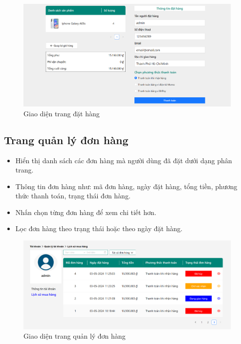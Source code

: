 \begin{figure}[H]
    \begin{center}
    \includegraphics[scale=0.4]{images/hieu/chap-5/payment.png}
    \vspace*{3mm}
    \caption{Giao diện trang đặt hàng}
    \end{center}
\end{figure}
\subsection{Trang quản lý đơn hàng}
\begin{itemize}
    \item Hiển thị danh sách các đơn hàng mà người dùng đã đặt dưới dạng phân trang.
    \item Thông tin đơn hàng như: mã đơn hàng, ngày đặt hàng, tổng tiền, phương thức thanh toán, trạng thái đơn hàng.
    \item Nhấn chọn từng đơn hàng để xem chi tiết hơn.
    \item Lọc đơn hàng theo trạng thái hoặc theo ngày đặt hàng.
\end{itemize}

\begin{figure}[H]
    \begin{center}
    \includegraphics[scale=0.43]{images/hieu/chap-5/ordered.png}
    \vspace*{3mm}
    \caption{Giao diện trang quản lý đơn hàng}
    \end{center}
\end{figure}
